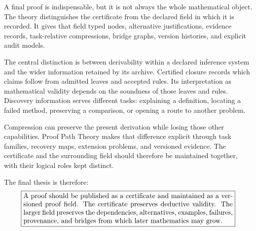 A final proof is indispensable, but it is not always the whole mathematical object. The theory distinguishes the certificate from the declared field in which it is recorded. It gives that field typed nodes, alternative justifications, evidence records, task-relative compressions, bridge graphs, version histories, and explicit audit models.

The central distinction is between derivability within a declared inference system and the wider information retained by its archive. Certified closure records which claims follow from admitted leaves and accepted rules. Its interpretation as mathematical validity depends on the soundness of those leaves and rules. Discovery information serves different tasks: explaining a definition, locating a failed method, preserving a comparison, or opening a route to another problem.

Compression can preserve the present derivation while losing those other capabilities. Proof Path Theory makes that difference explicit through task families, recovery maps, extension problems, and versioned evidence. The certificate and the surrounding field should therefore be maintained together, with their logical roles kept distinct.

The final thesis is therefore:
\[
\boxed{\begin{minipage}{0.88\linewidth}
A proof should be published as a certificate and maintained as a versioned proof field. The certificate preserves deductive validity. The larger field preserves the dependencies, alternatives, examples, failures, provenance, and bridges from which later mathematics may grow.
\end{minipage}}
\]


\FloatBarrier

